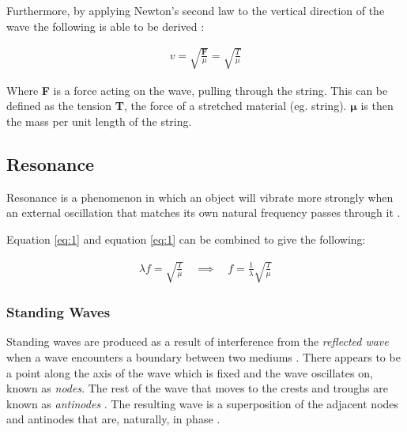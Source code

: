 \documentclass[12pt]{article}
\begin{document}
Furthermore, by applying Newton's second law to the vertical direction of the wave the following is able to be derived \cite{librewave}:

\vspace{-1.5ex}
\begin{gather} \label{eq:2}
    v = \sqrt{\frac{\textbf{F}}{\mu}} = \sqrt{\frac{T}{\mu}}
\end{gather}

Where \textbf{F} is a force acting on the wave, pulling through the string. This can be defined as the tension \textbf{T}, the force of a stretched material (eg. string). $\mathbf{\mu}$ is then
the mass per unit length of the string.

\subsection{Resonance}

Resonance is a phenomenon in which an object will vibrate more strongly when an external oscillation that matches its own natural frequency passes through it \cite{resbrit,reslibre}.

Equation \ref{eq:1} and equation \ref{eq:1} can be combined to give the following:

\vspace{-1.5ex}
\begin{gather} \label{eq:3}
    \lambda f = \sqrt{\frac{T}{\mu}} \quad \implies \quad f = \frac{1}{\lambda} \sqrt{\frac{T}{\mu}}
\end{gather}

\subsubsection{Standing Waves} \label{sec:1.2.1}

Standing waves are produced as a result of interference from the \textit{reflected wave} when a wave encounters a boundary between two mediums \cite{librestand,MARION1981341,OZEROV2007105,isaacwave}.
There appears to be a point along the axis of the wave which is fixed and the wave oscillates on, known as \textit{nodes}. The rest of the wave that moves to the crests and troughs are known as \textit{antinodes}
\cite{isaacwave}.
The resulting wave is a superposition of the adjacent nodes and antinodes that are, naturally, in phase \cite{isaacwave,librestand,MARION1981341}.
\end{document}
